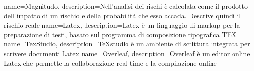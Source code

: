 {
    name=Magnitudo,
    description={Nell'analisi dei rischi è calcolata come il prodotto dell'impatto di un rischio e della probabilità che esso accada. Descrive quindi il rischio reale}
}
{
    name=Latex,
    description={Latex è un linguaggio di markup per la preparazione di testi, basato sul programma di composizione tipografica TEX}
}
{
    name=TexStudio,
    description={TeXstudio è un ambiente di scrittura integrata per scrivere documenti Latex}
}
{
    name=Overleaf,
    description={Overleaf è un editor online Latex che permette la collaborazione real-time e la compilazione online}
}



